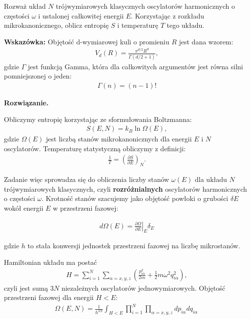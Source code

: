 \documentclass[11pt,a4paper]{article}
\newenvironment{solution}{\vspace{1cm} \par\textbf{Rozwiązanie.} \vspace{1cm}}{}
\begin{document}
Rozważ układ $N$ trójwymiarowych klasycznych oscylatorów harmonicznych o
częstości $\omega$ i ustalonej całkowitej energii $E$. 
Korzystając z rozkładu mikrokanonicznego, oblicz entropię $S$ i temperaturę $T$ 
tego układu.

{\bf Wskazówka:} Objętość d-wymiarowej kuli o promieniu $R$ jest dana wzorem:
\begin{align*}
V_d(R) = \frac{\pi^{d/2}R^{d}}{\Gamma(d/2+1)},
\end{align*}
gdzie $\Gamma$ jest funkcją Gamma, która dla całkowitych argumentów jest równa silni pomniejszonej o jeden:
\begin{align*}\Gamma(n) = (n-1)!
\end{align*}

\begin{solution}

Obliczymy entropię korzystając ze sformułowania Boltzmanna:
\begin{align*}
S(E,N) = k_B \ln \Omega(E),
\end{align*}
gdzie $\Omega(E)$ jest liczbą stanów mikrokanonicznych dla energii $E$ i $N$ 
oscylatorów. Temperaturę statystyczną obliczymy z definicji:
\begin{align*}
\frac{1}{T} = \left( \frac{\partial S}{\partial E} \right)_N.
\end{align*}

Zadanie więc sprowadza się do obliczenia liczby  stanów 
$\omega(E)$ dla układu $N$ trójwymiarowych 
klasycznych, czyli {\bf rozróżnialnych} oscylatorów harmonicznych 
o częstości $\omega$. Krotność stanów  szacujemy jako 
objętość powłoki o grubości $\delta E$ wokół energii $E$ w przestrzeni fazowej:

\begin{align*}
d\Omega(E) = \left.\frac{\partial \Omega}{\partial E}\right|_{E} \delta_E
\end{align*}

gdzie $h$ to stała konwersji jednostek przestrzeni fazowej na liczbę 
mikrostanów. 

Hamiltonian układu ma postać
\begin{align*}
H = \sum_{i=1}^{N}\sum_{\alpha=x,y,z}\left(\frac{p_{i\alpha}^2}{2m}+\frac{1}{2}m\omega^2 q_{i\alpha}^2\right),
\end{align*}
czyli jest sumą $3N$ niezależnych oscylatorów jednowymiarowych.
Objętość przestrzeni fazowej dla energii  $H<E$:
\begin{align*}
\Omega(E, N) = \frac{1}{h^{3N}} \int_{H<E} \prod_{i=1}^{N}\prod_{\alpha=x,y,z} dp_{i\alpha} dq_{i\alpha}
 \, 
\end{align*}


\end{solution}
\end{document}
